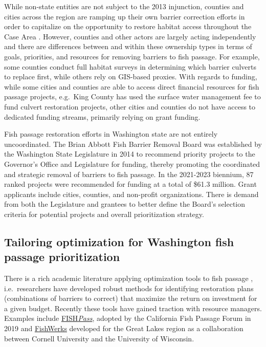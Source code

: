 While non-state entities are not subject to the 2013 injunction, counties and cities across the region are ramping up their own barrier correction efforts in order to capitalize on the opportunity to restore habitat access throughout the Case Area \citep{brown_coming_2019}. However, counties and other actors are largely acting independently and there are differences between and within these ownership types in terms of goals, priorities, and resources for removing barriers to fish passage. For example, some counties conduct full habitat surveys in determining which barrier culverts to replace first, while others rely on GIS-based proxies. With regards to funding, while some cities and counties are able to access direct financial resources for fish passage projects, e.g.\ King County has used the surface water management fee to fund culvert restoration projects, other cities and counties do not have access to dedicated funding streams, primarily relying on grant funding.  

Fish passage restoration efforts in Washington state are not entirely uncoordinated. The Brian Abbott Fish Barrier Removal Board was established by the Washington State Legislature in 2014 to recommend priority projects to the Governor's Office and Legislature for funding, thereby promoting the coordinated and strategic removal of barriers to fish passage. In the 2021-2023 biennium, 87 ranked projects were recommended for funding at a total of \$61.3 million. Grant applicants include cities, counties, and non-profit organizations. There is demand from both the Legislature and grantees to better define the Board's selection criteria for potential projects and overall prioritization strategy. 

\subsection*{Tailoring optimization for Washington fish passage prioritization}

There is a rich academic literature applying optimization tools to fish passage \citep{ohanley_optimizing_2005, kuby_multiobjective_2005, mcmanamay_commonalities_2019, couto_safeguarding_2021}, i.e.\ researchers have developed robust methods for identifying restoration plans (combinations of barriers to correct) that maximize the return on investment for a given budget. Recently these tools have gained traction with resource managers. Examples include  \href{https://fishpass.psmfc.org}{FISH\emph{Pass}}, adopted by the California Fish Passage Forum in 2019 and \href{https://greatlakesconnectivity.org}{FishWerks} developed for the Great Lakes region as a collaboration between Cornell University and the University of Wisconsin. 

